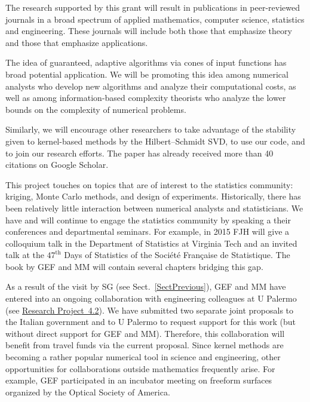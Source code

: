 \documentclass[11pt]{NSFamsart}
\newcommand{\refprobdb}{\hyperref[SectMEEG]{Research Project~4.2}\xspace}
\begin{document}
\begin{description}[leftmargin=0ex]
\item[Disseminating Research]
The research supported by this grant will result in publications in peer-reviewed journals in a broad spectrum of applied mathematics, computer science, statistics and engineering. These journals will include both those that emphasize theory and those that emphasize applications.

\item[Promoting Cones] The idea of guaranteed, adaptive algorithms via cones of input functions has broad potential application.  We will be promoting this idea among numerical analysts who develop new algorithms and analyze their computational costs, as well as among information-based complexity theorists who analyze the lower bounds on the complexity of numerical problems.

\item[Promoting the Hilbert--Schmidt SVD] Similarly, we will encourage other researchers to take advantage of the stability given to kernel-based methods by the Hilbert--Schmidt SVD, to use our code, and to join our research efforts. The paper \citep{FMcC12} has already received more than 40 citations on Google Scholar.

\item[Bridging Mathematics and Statistics]
This project touches on topics that are of interest to the statistics community: kriging, Monte Carlo methods, and design of experiments.  Historically, there has been relatively little interaction between numerical analysts and statisticians.  We have and will continue to engage the statistics community by speaking a their conferences and departmental seminars.  For example, in 2015 FJH will give a colloquium talk in the Department of Statistics at Virginia Tech and an invited talk at the $47^{\text{th}}$ Days of Statistics of the Soci\'et\'e Fran\c{c}aise de Statistique. The book \citep{FMcC15} by GEF and MM will contain several chapters bridging this gap.

\item[Collaborating with Engineers]
As a result of the visit by SG (see Sect.~\ref{SectPrevious}), GEF and MM have entered into an ongoing collaboration with engineering colleagues at U Palermo (see \refprobdb). We have submitted two separate joint proposals to the Italian government and to U Palermo to request support for this work (but without direct support for GEF and MM). Therefore, this collaboration will benefit from travel funds via the current proposal.
Since kernel methods are becoming a rather popular numerical tool in science and engineering, other opportunities for collaborations outside mathematics frequently arise. For example, GEF participated in an incubator meeting on freeform surfaces organized by the Optical Society of America.


\end{description}
\end{document}
